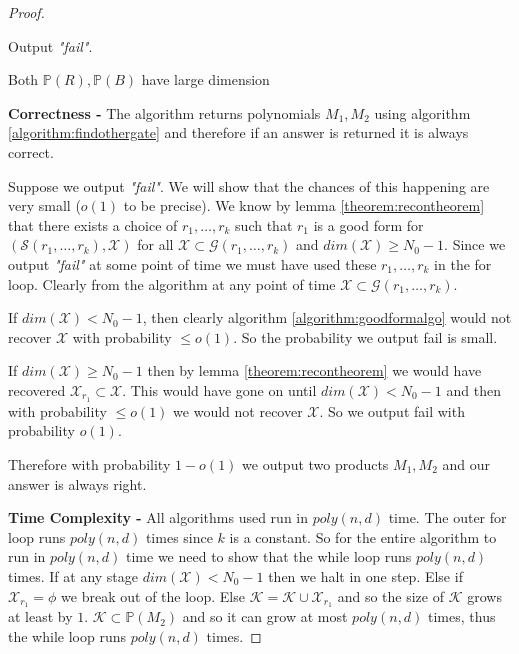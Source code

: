 \documentclass[12pt]{caltech_thesis}
\theoremstyle{plain}
\theoremstyle{definition}
\newcommand{\MS}{\mathcal{S}}
\newcommand{\MG}{\mathcal{G}}
\newcommand{\MX}{\mathcal{X}}
\newcommand{\MK}{\mathcal{K}}
\newcommand{\PP}{\mathbb{P}}
\begin{document}
\begin{proof}
\begin{algorithm}[H]
{{}

}
Output \emph{"fail"}.
\caption{ Both $\PP(R),\PP(B)$ have large dimension }
\end{algorithm}
\textbf{Correctness - } The algorithm returns polynomials $M_1,M_2$ using algorithm \ref{algorithm:findothergate} and therefore
if an answer is returned it is always correct. 

Suppose we output \emph{"fail"}. We will show that the chances of this happening are very small ($o(1)$ to be precise). 
We know by lemma \ref{theorem:recontheorem} that there exists a choice of $r_1,\ldots,r_k$
such that $r_1$ is a good form for $(\MS(r_1,\ldots,r_k), \MX)$ for all $\MX\subset \MG(r_1,\ldots,r_k)$ and $dim(\MX) \geq N_0-1$.
Since we output \emph{"fail"} at some point of time we must have used these $r_1,\ldots,r_k$ in the for loop. Clearly from the 
algorithm at any point of time $\MX \subset \MG(r_1,\ldots,r_k)$. 

If $dim(\MX) < N_0-1$, then clearly algorithm \ref{algorithm:goodformalgo}
would not recover $\MX$ with probability $\leq o(1)$. So the probability we output fail is small.

If $dim(\MX)\geq N_0-1$ then by lemma \ref{theorem:recontheorem} we would have 
recovered $\MX_{r_1}\subset \MX$. This would have gone on until $dim(\MX) < N_0-1$ and then with probability
$\leq o(1)$ we would not recover $\MX$. So we output fail with probability $o(1)$.

Therefore with probability $1-o(1)$ we output two products $M_1,M_2$ and our answer is always right.

\textbf{Time Complexity - }
All algorithms used run in $poly(n,d)$ time. The outer for loop runs $poly(n,d)$ times since $k$ is a constant.
 So for the entire algorithm to run in $poly(n,d)$ time we need to show that the while loop runs $poly(n,d)$ times. 
 If at any stage $dim(\MX) <N_0-1$ then we halt in one step.
 Else if $\MX_{r_1}=\phi$ we break out of the loop. Else $\MK = \MK\cup \MX_{r_1}$ and so the size of $\MK$ grows at least by $1$.
 $\MK \subset \PP(M_2)$ and so it can grow at most $poly(n,d)$ times, thus the while loop runs $poly(n,d)$ times.  

\end{proof}










\printbibliography[heading=bibintoc]

\appendix
\end{document}
